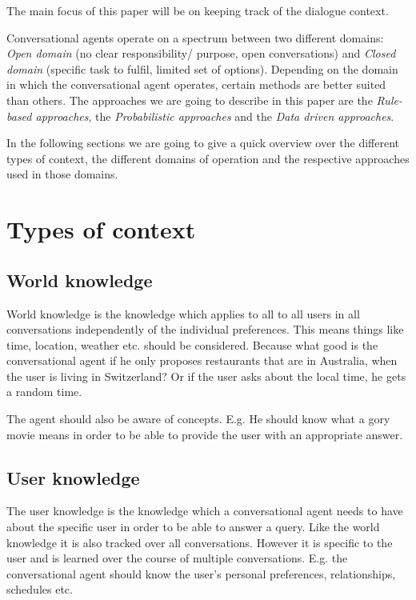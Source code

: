 \documentclass[conference]{IEEEtran}
\begin{document}
The main focus of this paper will be on keeping track of the dialogue context.

Conversational agents operate on a spectrum between two different domains: \emph{Open domain} (no clear responsibility/ purpose\cite{klopfenstein2017rise}, open conversations) and \emph{Closed domain} (specific task to fulfil, limited set of options). 
Depending on the domain in which the conversational agent operates, certain methods are better suited than others. The approaches we are going to describe in this paper are the
\emph{Rule-based approaches}, the \emph{Probabilistic approaches} and the \emph{Data driven approaches}.

In the following sections we are going to give a quick overview over the different types of context, the different domains of operation and the respective approaches used in those domains.

\section{Types of context}
\subsection{World knowledge}
World knowledge is the knowledge which applies to all to all users in all conversations independently of the individual preferences. 
This means things like  time, location, weather etc. should be considered. Because what good is the conversational agent if he only proposes restaurants that are in Australia, when the user is living in Switzerland? Or if the user asks about the local time, he gets a random time. 


The agent should also be aware of concepts. E.g. He should know what a gory movie means in order to be able to provide the user with an appropriate answer\cite{radlinski2017theoretical}.
 

\subsection{User knowledge}
The user knowledge is the knowledge which a conversational agent needs to have about the specific user in order to be able to answer a query. Like the world knowledge it is also tracked over all conversations. However it is specific to the user and is learned over the course of multiple conversations.
E.g. the conversational agent should know the user's personal preferences, relationships, schedules etc. 
\end{document}
